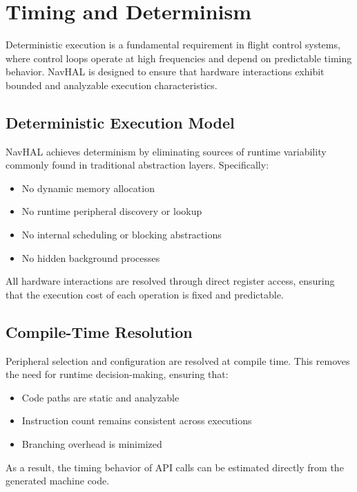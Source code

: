 \section{Timing and Determinism}
\label{sec:navhal_timing_determinism}

Deterministic execution is a fundamental requirement in flight control systems, where control loops operate at high frequencies and depend on predictable timing behavior. NavHAL is designed to ensure that hardware interactions exhibit bounded and analyzable execution characteristics.

\subsection*{Deterministic Execution Model}

NavHAL achieves determinism by eliminating sources of runtime variability commonly found in traditional abstraction layers. Specifically:

\begin{itemize}
    \item No dynamic memory allocation
    \item No runtime peripheral discovery or lookup
    \item No internal scheduling or blocking abstractions
    \item No hidden background processes
\end{itemize}

All hardware interactions are resolved through direct register access, ensuring that the execution cost of each operation is fixed and predictable.

\subsection*{Compile-Time Resolution}

Peripheral selection and configuration are resolved at compile time. This removes the need for runtime decision-making, ensuring that:

\begin{itemize}
    \item Code paths are static and analyzable
    \item Instruction count remains consistent across executions
    \item Branching overhead is minimized
\end{itemize}

As a result, the timing behavior of API calls can be estimated directly from the generated machine code.

